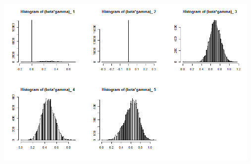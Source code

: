 \documentclass[10pt,a4paper]{article}
\begin{document}
\centerline{\includegraphics[width=13cm,height=13cm,keepaspectratio]{./images/Prob33}}
\end{document}
